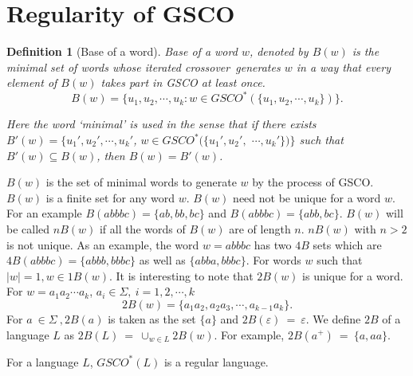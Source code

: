 \documentclass{llncs}
\newtheorem{defin}{Definition}
\newcommand{\sa}{crossover~}
\newcommand{\sg}{\Sigma}
\newcommand{\ve}{\varepsilon}
\begin{document}
\section{Regularity of GSCO}
\begin{defin}[Base of a word]
Base of a word $w$, denoted by $B(w)$ is the minimal set of words
whose iterated \sa generates $w$ in a way that every element of
$B(w)$ takes part in GSCO at least once.
\[B(w)=\{u_1,u_2,\cdots,u_k:w\in GSCO^*(\{u_1,u_2,\cdots,u_k\})\}.\]
\par Here the word `minimal' is used in the sense that if there exists
$B'(w)= \{u_1',u_2',\cdots,u_{k}'$, $w\in GSCO^*(\{u_1',u_2',$
$\cdots,u_k'\})\}$ such that $B'(w)\subseteq B(w)$, then
$B(w)=B'(w)$.
\end{defin}
\par $B(w)$ is the set of minimal words to generate $w$ by the process of GSCO.
$B(w)$ is a finite set for any word $w$. $B(w)$ need not be unique for a word $w$.
For an example $B(abbbc)=\{ab,bb,bc\}$ and $B(abbbc)=\{abb,bc\}$. $B(w)$ will be called
$nB(w)$ if all the words of $B(w)$ are of length $n$. $nB(w)$ with $n>2$ is not unique.
 As an example, the word $w=abbbc$ has two $4B$ sets which are
  $4B(abbbc)=\{abbb,bbbc\}$ as well as $\{abba,bbbc\}$.
  For words $w$ such
 that $|w|=1, w\in1B(w)$. It is interesting to note that $2B(w)$ is unique for a word.
  For $w=a_1a_2\cdots a_k$, $a_i\in\sg,~i=1,2,\cdots, k$
\[
2B(w)=\{a_1a_2,a_2a_3,\cdots,a_{k-1}a_k\}.\]
 For $a~\in \Sigma~,
2B(a)$ is taken as  the set $\{a\}$ and $2B(\ve)~=~\ve$. We define
$2B$ of a language $L$ as $2B(L)~=~\cup_{w \in L} 2B(w)$. For
example, $2B(a^+)~=~\{a, aa\}$.
\begin{theorem}
For a language $L$, $GSCO^*(L)$  is a regular language.
\end{theorem}
\end{document}
